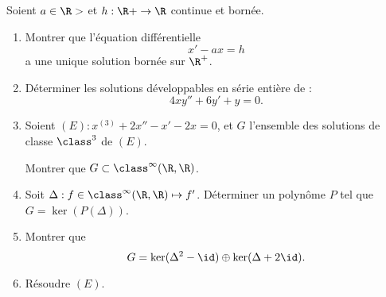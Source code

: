 \begin{enonce}
\begin{exercise}[ID={RMS135 E1486},subtitle={IMT MP 2024},tags={},difficulty={}]

Soient $a \in \R>$ et $h : \R+ \to \R$ continue et bornée.

\begin{enumerate}
    \item Montrer que l’équation différentielle
    \begin{equation*}
    x' - a x = h
    \end{equation*}
    a une unique solution bornée sur $\R^+$.

  \item Déterminer les solutions développables en série entière de :
  \begin{equation*}
  4x y'' + 6y' + y = 0.
  \end{equation*}
  
  \item 
  Soient $(E) : x^{(3)} + 2x'' - x' - 2x = 0$, et $G$ l’ensemble des solutions de classe $\class^3$ de $(E)$.

   Montrer que $G \subset \class^{\infty}(\R, \R)$.


  \item
      Soit $\Delta : f \in \class^{\infty}(\R, \R) \mapsto f'$.
    Déterminer un polynôme $P$ tel que $G = \ker(P(\Delta))$.

  \item Montrer que 
  \begin{equation*}
  G = \ker(\Delta^2 - \id) \oplus \ker(\Delta + 2\id).
  \end{equation*}

  \item Résoudre $(E)$.
\end{enumerate}
\end{exercise}
\begin{solution}
\end{solution}
\end{enonce}
